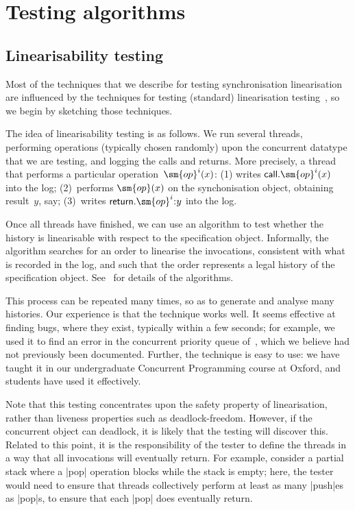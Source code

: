 \section{Testing algorithms}
\label{sec:testing}

\subsection{Linearisability testing}

Most of the techniques that we describe for testing synchronisation
linearisation are influenced by the techniques for testing (standard)
linearisation testing~\cite{gavin:lin-testing}, so we begin by sketching those
techniques. 

The idea of linearisability testing is as follows.  We run several threads,
performing operations (typically chosen randomly) upon the concurrent datatype
that we are testing, and logging the calls and returns.  More precisely, a
thread that performs a particular operation~$\sm{op}^i(x)$: (1) writes
$\call.\sm{op}^i(x)$ into the log; (2)~performs $\sm{op}(x)$ on the
synchonisation object, obtaining result~$y$, say; (3)~writes $\return.\sm{op}^i
\:: y$ into the log.  

Once all threads have finished, we can use an algorithm to test whether the
history is linearisable with respect to the specification object.  Informally,
the algorithm searches for an order to linearise the invocations, consistent
with what is recorded in the log, and such that the order represents a legal
history of the specification object.  See~\cite{gavin:lin-testing} for details
of the algorithms.

This process can be repeated many times, so as to generate and analyse many
histories.  Our experience is that the technique works well.  It seems
effective at finding bugs, where they exist, typically within a few seconds;
for example, we used it to find an error in the concurrent priority queue
of~\cite{faulty-pri-queue}, which we believe had not previously been
documented.  Further, the technique is easy to use: we have taught it in our
undergraduate Concurrent Programming course at Oxford, and students have used
it effectively.

Note that this testing concentrates upon the safety property of linearisation,
rather than liveness properties such as deadlock-freedom.  However, if the
concurrent object can deadlock, it is likely that the testing will discover
this.  Related to this point, it is the responsibility of the tester to define
the threads in a way that all invocations will eventually return.  For
example, consider a partial stack where a |pop| operation blocks while the
stack is empty; here, the tester would need to ensure that threads
collectively perform at least as many |push|es as |pop|s, to ensure that each
|pop| does eventually return. 

